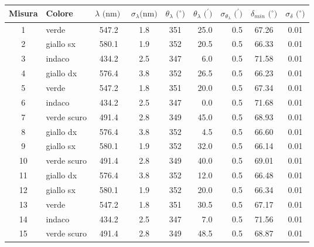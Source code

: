 \begin{table}[!htbp]
    {\par\centering
    \begin{tabular}{clcccrrcc}
        \hline
            Misura & 
            Colore & 
            $\lambda \text{ (nm) }$ & 
            $\sigma_{\lambda} \text{(nm)}$ & 
            $\theta_{\lambda} \text{ ($^{\circ}$)}$ & 
            $\theta_{\lambda} \text{ ($^{\prime}$)}$ & 
            $\sigma_{\theta_{\lambda}} \text{ ($^{\prime}$)}$ &
            $\delta_{min} \text{ ($^{\circ}$)}$ & 
            $\sigma_{\delta} \text{ ($^{\circ}$)}$ \\
        \hline
            1   &   verde        &   547.2  & 1.8 &  351 &   25.0  & 0.5 & 67.26 &   0.01\\
            2   &   giallo sx    &   580.1  & 1.9 &  352 &   20.5  & 0.5 & 66.33 &   0.01\\
            3   &   indaco       &   434.2  & 2.5 &  347 &   6.0   & 0.5 & 71.58 &   0.01\\
            4   &   giallo dx    &   576.4  & 3.8 &  352 &   26.5  & 0.5 & 66.23 &   0.01\\
            5   &   verde        &   547.2  & 1.8 &  351 &   20.0  & 0.5 & 67.34 &   0.01\\
            6   &   indaco       &   434.2  & 2.5 &  347 &   0.0   & 0.5 & 71.68 &   0.01\\
            7   &   verde scuro  &   491.4  & 2.8 &  349 &   45.0  & 0.5 & 68.93 &   0.01\\
            8   &   giallo dx    &   576.4  & 3.8 &  352 &   4.5   & 0.5 & 66.60 &   0.01\\
            9   &   giallo sx    &   580.1  & 1.9 &  352 &   32.0  & 0.5 & 66.14 &   0.01\\
            10  &   verde scuro  &   491.4  & 2.8 &  349 &   40.0  & 0.5 & 69.01 &   0.01\\
            11  &   giallo dx    &   576.4  & 3.8 &  352 &   12.0  & 0.5 & 66.48 &   0.01\\
            12  &   giallo sx    &   580.1  & 1.9 &  352 &   20.0  & 0.5 & 66.34 &   0.01\\
            13  &   verde        &   547.2  & 1.8 &  351 &   30.5  & 0.5 & 67.17 &   0.01\\
            14  &   indaco       &   434.2  & 2.5 &  347 &   7.0   & 0.5 & 71.56 &   0.01\\
            15  &   verde scuro  &   491.4  & 2.8 &  349 &   48.5  & 0.5 & 68.87 &   0.01\\

\end{tabular}}
\end{table}
